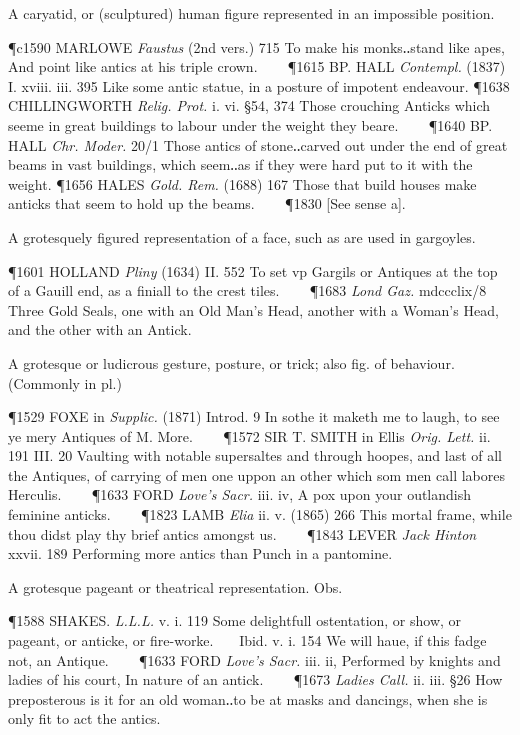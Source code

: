 \begin{description}[wide, labelwidth=!, labelindent=0pt]
\begin{myenumerate}
 A caryatid, or (sculptured) human figure represented in an impossible
position. 

\P c1590 MARLOWE \textit{Faustus} (2nd vers.) 715 To make his monks‥stand like apes, And
point like antics at his triple crown.    
\P 1615 BP. HALL \textit{Contempl.} (1837) I.
xviii. iii. 395 Like some antic statue, in a posture of impotent endeavour.
\P 1638 CHILLINGWORTH \textit{Relig. Prot.} i. vi. §54, 374 Those crouching Anticks which
seeme in great buildings to labour under the weight they beare.    
\P 1640 BP. HALL \textit{Chr. Moder.} 20/1 Those antics of stone‥carved out under the end of great beams
in vast buildings, which seem‥as if they were hard put to it with the weight.
\P 1656 HALES \textit{Gold. Rem.} (1688) 167 Those that build houses make anticks that
seem to hold up the beams.    
\P 1830 [See sense a].

 A grotesquely figured representation of a face, such as are used in
gargoyles. 

\P 1601 HOLLAND \textit{Pliny} (1634) II. 552 To set vp Gargils or Antiques at the top of
a Gauill end, as a finiall to the crest tiles.    
\P 1683 \textit{Lond Gaz.} mdccclix/8
Three Gold Seals, one with an Old Man's Head, another with a Woman's Head, and
the other with an Antick.

 A grotesque or ludicrous gesture, posture, or trick; also fig. of
behaviour. (Commonly in pl.) 

\P 1529 FOXE in \textit{Supplic.} (1871) Introd. 9 In sothe it maketh me to laugh, to see
ye mery Antiques of M. More.    
\P 1572 SIR T. SMITH in Ellis \textit{Orig. Lett.} ii. 191
III. 20 Vaulting with notable supersaltes and through hoopes, and last of all
the Antiques, of carrying of men one uppon an other which som men call labores
Herculis.    
\P 1633 FORD \textit{Love's Sacr.} iii. iv, A pox upon your outlandish feminine
anticks.    
\P 1823 LAMB \textit{Elia} ii. v. (1865) 266 This mortal frame, while thou didst
play thy brief antics amongst us.    
\P 1843 LEVER \textit{Jack Hinton} xxvii. 189
Performing more antics than Punch in a pantomine.

 A grotesque pageant or theatrical representation. Obs. 

\P 1588 SHAKES. \textit{L.L.L.} v. i. 119 Some delightfull ostentation, or show, or
pageant, or anticke, or fire-worke.    Ibid. v. i. 154 We will haue, if this
fadge not, an Antique.    
\P 1633 FORD \textit{Love's Sacr.} iii. ii, Performed by knights
and ladies of his court, In nature of an antick.    
\P 1673 \textit{Ladies Call.} ii. iii.
§26 How preposterous is it for an old woman‥to be at masks and dancings, when
she is only fit to act the antics.


\end{myenumerate}
\end{description}
